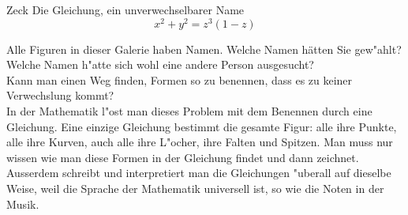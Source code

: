 \begin{surferPage}{Zeck}
Die Gleichung, ein unverwechselbarer Name \\
\smallskip
\[x^2 + y^2	= z^3	(1 - z) \]


\singlespacing
Alle Figuren in dieser Galerie haben Namen. Welche Namen h\"atten Sie gew"ahlt? Welche Namen h"atte sich wohl eine andere Person ausgesucht?\\
\vspace{0.3cm}
Kann man einen Weg finden, Formen so zu benennen, dass es zu keiner Verwechslung kommt? \\
In der Mathematik l"ost man dieses Problem mit dem Benennen durch eine Gleichung. Eine einzige Gleichung bestimmt die gesamte Figur: alle ihre Punkte, alle ihre Kurven, auch alle ihre L"ocher, ihre Falten und Spitzen. Man muss nur wissen wie man diese Formen in der Gleichung findet und dann zeichnet.\\

\vspace{0.3cm}
Ausserdem schreibt und interpretiert man die Gleichungen "uberall auf dieselbe Weise, weil die Sprache der Mathematik universell ist, so wie die Noten in der Musik.
\end{surferPage}
